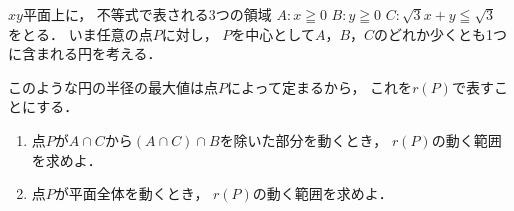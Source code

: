 \documentclass[../../main.tex]{subfiles}
\begin{document}
$xy$平面上に，
不等式で表される3つの領域
$A:x\geqq0$ $B:y\geqq0$ $C:\sqrt3x+y\leqq\sqrt3$
をとる．
いま任意の点$P$に対し，
$P$を中心として$A$，$B$，$C$のどれか少くとも1つに含まれる円を考える．

このような円の半径の最大値は点$P$によって定まるから，
これを$r(P)$で表すことにする．
\begin{enumerate}
  \item 点$P$が$A \cap C$から$(A \cap C) \cap B$を除いた部分を動くとき，
    $r(P)$の動く範囲を求めよ．
  \item 点$P$が平面全体を動くとき，
    $r(P)$の動く範囲を求めよ．
\end{enumerate}
\end{document}
